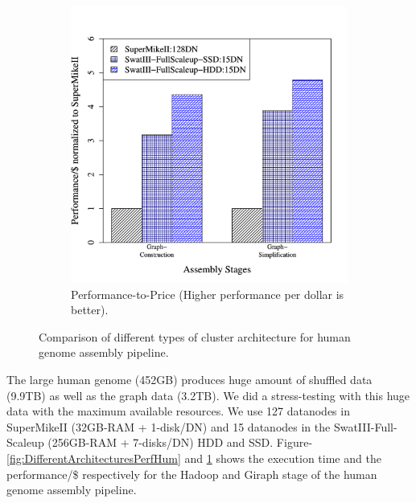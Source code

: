 \documentclass[conference]{IEEEtran}
\begin{document}
\begin{figure}[htb]
\begin{subfigure}[b]{0.23\textwidth}
                \includegraphics[width=\textwidth]{Figure/PerormanceData/Plots/PerfPerDollarDiffArchHum.pdf}
                \caption{Performance-to-Price (Higher performance per dollar is better).}
                \label{fig:DifferentArchitecturesPerfPerDollarHum}
        \end{subfigure}
        \caption{Comparison of different types of cluster architecture for human genome assembly pipeline.}
  \label{fig:DifferentArchitecturesHum}
  \vspace{-1.9em}
\end{figure}
The large human genome (452GB)  produces huge amount of shuffled data (9.9TB) as well as the graph data (3.2TB). 
We did a stress-testing with this huge data with the maximum available resources. 
We use 127 datanodes in SuperMikeII (32GB-RAM + 1-disk/DN) and 15 datanodes in the SwatIII-Full-Scaleup (256GB-RAM + 7-disks/DN) HDD and SSD.
Figure-\ref{fig:DifferentArchitecturesPerfHum} and \ref{fig:DifferentArchitecturesPerfPerDollarHum} shows the execution time and the performance/\$ respectively for the Hadoop and Giraph stage of the human genome assembly pipeline. 
\end{document}
